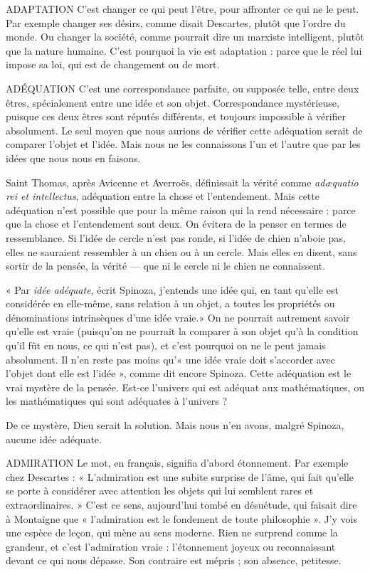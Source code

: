ADAPTATION C’est changer ce qui peut l'être, pour affronter ce qui ne le
peut. Par exemple changer ses désirs, comme disait Descartes,
plutôt que l’ordre du monde. Ou changer la société, comme pourrait
dire un marxiste intelligent, plutôt que la nature humaine.
C’est pourquoi la vie est adaptation : parce que le réel lui impose sa loi, qui
est de changement ou de mort.

ADÉQUATION C’est une correspondance parfaite, ou supposée telle, entre
deux êtres, spécialement entre une idée et son objet. Correspondance
mystérieuse, puisque ces deux êtres sont réputés différents, et toujours
impossible à vérifier absolument. Le seul moyen que nous aurions de vérifier
cette adéquation serait de comparer l’objet et l’idée. Mais nous ne les
connaissons l’un et l’autre que par les idées que nous nous en faisons.

Saint Thomas, après Avicenne et Averroës, définissait la vérité comme {\it ad{\ae}quatio
rei et intellectus}, adéquation entre la chose et l’entendement. Mais cette
adéquation n’est possible que pour la même raison qui la rend nécessaire :
parce que la chose et l’entendement sont deux. On évitera de la penser en
termes de ressemblance. Si l’idée de cercle n’est pas ronde, si l’idée de chien
n’aboie pas, elles ne sauraient ressembler à un chien ou à un cercle. Mais elles en
disent, sans sortir de la pensée, la vérité — que ni le cercle ni le chien ne
connaissent.

« Par {\it idée adéquate}, écrit Spinoza, j'entends une idée qui, en tant qu’elle est
considérée en elle-même, sans relation à un objet, a toutes les propriétés ou
dénominations intrinsèques d’une idée vraie.» On ne pourrait autrement
savoir qu’elle est vraie (puisqu'on ne pourrait la comparer à son objet qu’à la
condition qu’il fût en nous, ce qui n’est pas), et c’est pourquoi on ne le peut
jamais absolument. Il n’en reste pas moins qu’« une idée vraie doit s’accorder
avec l’objet dont elle est l’idée », comme dit encore Spinoza. Cette adéquation
est le vrai mystère de la pensée. Est-ce l’univers qui est adéquat aux mathématiques,
ou les mathématiques qui sont adéquates à l’univers ?

De ce mystère, Dieu serait la solution. Mais nous n’en avons, malgré Spinoza,
aucune idée adéquate.

ADMIRATION Le mot, en français, signifia d’abord étonnement. Par exemple
chez Descartes : « L’admiration est une subite surprise de
l’âme, qui fait qu’elle se porte à considérer avec attention les objets qui lui semblent
rares et extraordinaires. » C’est ce sens, aujourd’hui tombé en désuétude,
qui faisait dire à Montaigne que « l'admiration est le fondement de toute
philosophie ». J’y vois une espèce de leçon, qui mène au sens moderne. Rien ne
surprend comme la grandeur, et c’est l’admiration vraie : l’étonnement joyeux
ou reconnaissant devant ce qui nous dépasse.
Son contraire est mépris ; son absence, petitesse.

